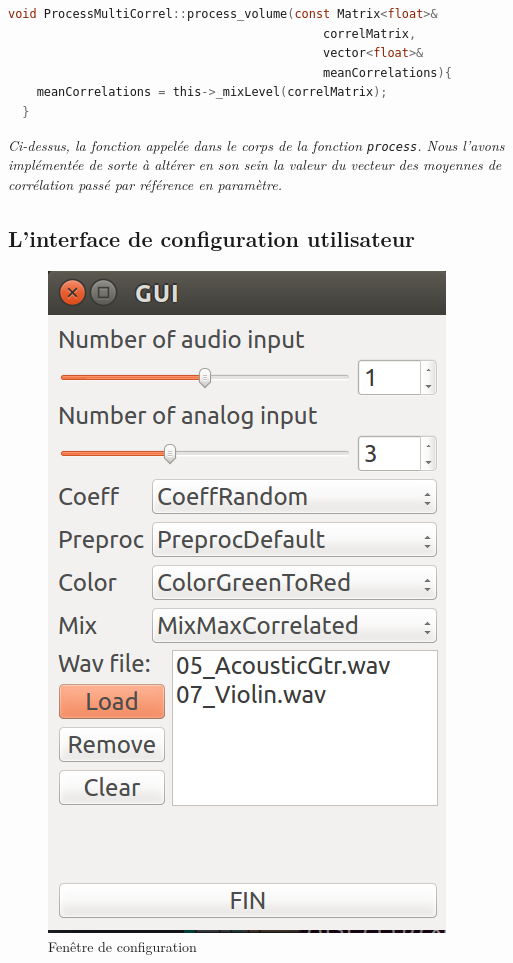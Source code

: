  \begin{lstlisting}[language=C, frame=single, breaklines=true]
  void ProcessMultiCorrel::process_volume(const Matrix<float>&
                                            correlMatrix,
                                            vector<float>&
                                            meanCorrelations){
    meanCorrelations = this->_mixLevel(correlMatrix);
  }
 \end{lstlisting}
 \begin{center}
  \textit{Ci-dessus, la fonction appelée dans le corps de la fonction \verb!process!. Nous l'avons implémentée de sorte à altérer en son sein la valeur du vecteur des moyennes de corrélation passé par référence en paramètre.}
 \end{center}
 
 \subsection{L'interface de configuration utilisateur}
 
 \begin{figure}[H]
  \centering
  \includegraphics[scale=0.5]{assets/settingsWindow.png}
  \caption{Fenêtre de configuration}
  \label{schéma global}
 \end{figure}
 
